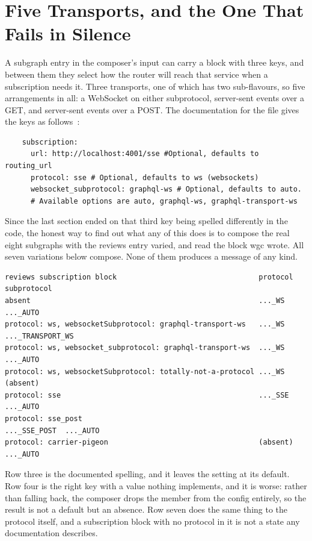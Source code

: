 \section{Five Transports, and the One That Fails in Silence}
\label{sec:ch14-five-transports}
%

A subgraph entry in the composer's input can carry a  block
with three keys, and between them they select how the router will reach that
service when a subscription needs it. Three transports, one of which has two
sub-flavours, so five arrangements in all: a WebSocket on either subprotocol,
server-sent events over a GET, and server-sent events over a POST. The
documentation for the file gives the keys as
follows~\autocite{cosmodocs2026compose}:

\begin{verbatim}
    subscription:
      url: http://localhost:4001/sse #Optional, defaults to routing_url
      protocol: sse # Optional, defaults to ws (websockets)
      websocket_subprotocol: graphql-ws # Optional, defaults to auto.
      # Available options are auto, graphql-ws, graphql-transport-ws
\end{verbatim}

Since the last section ended on that third key being spelled differently in the
code, the honest way to find out what any of this does is to compose the real
eight subgraphs with the reviews entry varied, and read the block wgc wrote.
All seven variations below compose. None of them produces a message of any
kind.

\begin{verbatim}
reviews subscription block                                 protocol      subprotocol
absent                                                     ..._WS        ..._AUTO
protocol: ws, websocketSubprotocol: graphql-transport-ws   ..._WS        ..._TRANSPORT_WS
protocol: ws, websocket_subprotocol: graphql-transport-ws  ..._WS        ..._AUTO
protocol: ws, websocketSubprotocol: totally-not-a-protocol ..._WS        (absent)
protocol: sse                                              ..._SSE       ..._AUTO
protocol: sse_post                                         ..._SSE_POST  ..._AUTO
protocol: carrier-pigeon                                   (absent)      ..._AUTO
\end{verbatim}

%
Row three is the documented spelling, and it leaves the setting at its default.
Row four is the right key with a value nothing implements, and it is worse:
rather than falling back, the composer drops the member from the config
entirely, so the result is not a default but an absence. Row seven does the same
thing to the protocol itself, and a subscription block with no protocol in it is
not a state any documentation describes.


